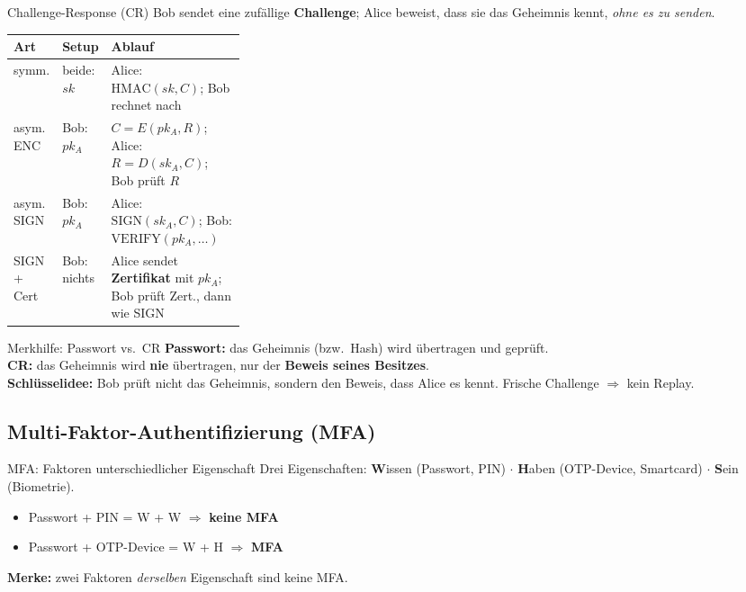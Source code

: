 \documentclass[a4paper, fontsize=7pt]{scrartcl}
\renewcommand*{\arraystretch}{1.5}  %
\begin{document}
\begin{mainbox}{Challenge-Response (CR)}
Bob sendet eine zufällige \textbf{Challenge}; Alice beweist, dass sie das
Geheimnis kennt, \emph{ohne es zu senden}.
\renewcommand*{\arraystretch}{1.2}
\setlength{\tabcolsep}{3pt}
\begin{tabularx}{\linewidth}{@{}>{\raggedright\arraybackslash}p{0.15\linewidth}|>{\raggedright\arraybackslash}p{0.15\linewidth}|>{\raggedright\arraybackslash}X@{}}
\textbf{Art} & \textbf{Setup} & \textbf{Ablauf} \\
\hline
symm. & beide: $sk$ & Alice: $\mathrm{HMAC}(sk, C)$; Bob rechnet nach \\
asym. ENC & Bob: $pk_A$ & $C = E(pk_A, R)$; Alice: $R = D(sk_A, C)$;
  Bob prüft $R$ \\
asym. SIGN & Bob: $pk_A$ & Alice: $\mathrm{SIGN}(sk_A, C)$; Bob:
  $\mathrm{VERIFY}(pk_A, \dots)$ \\
SIGN + Cert & Bob: nichts & Alice sendet \textbf{Zertifikat} mit $pk_A$;
  Bob prüft Zert., dann wie SIGN \\
\end{tabularx}
\end{mainbox}

\begin{subbox}{Merkhilfe: Passwort vs.\ CR}
\textbf{Passwort:} das Geheimnis (bzw.\ Hash) wird übertragen und geprüft.\\
\textbf{CR:} das Geheimnis wird \textbf{nie} übertragen, nur der
\textbf{Beweis seines Besitzes}.\\
\textbf{Schlüsselidee:} Bob prüft nicht das Geheimnis, sondern den Beweis,
dass Alice es kennt. Frische Challenge $\Rightarrow$ kein Replay.
\end{subbox}

\subsection{Multi-Faktor-Authentifizierung (MFA)}

\begin{mainbox}{MFA: Faktoren unterschiedlicher Eigenschaft}
Drei Eigenschaften: \textbf{W}issen (Passwort, PIN) $\cdot$
\textbf{H}aben (OTP-Device, Smartcard) $\cdot$ \textbf{S}ein (Biometrie).
\begin{itemize}
    \item Passwort + PIN = W + W $\Rightarrow$ \textbf{keine MFA}
    \item Passwort + OTP-Device = W + H $\Rightarrow$ \textbf{MFA}
\end{itemize}
\textbf{Merke:} zwei Faktoren \emph{derselben} Eigenschaft sind keine MFA.
\end{mainbox}
\end{document}
